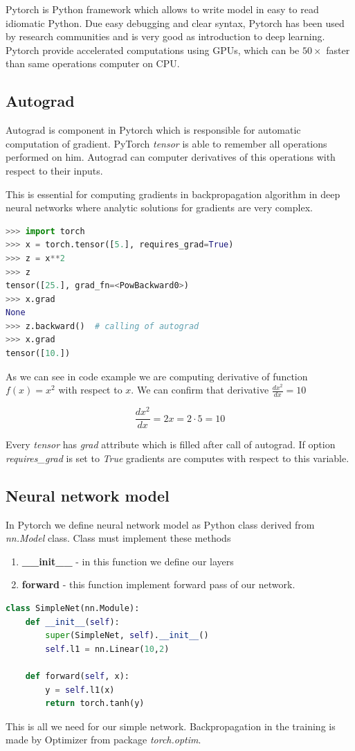Pytorch is Python framework which allows to write model in easy to read idiomatic Python. Due easy debugging and clear syntax, Pytorch has been used by research communities and is very good as introduction to deep learning. Pytorch provide accelerated computations using GPUs, which can be $50 \times$ faster than same operations computer on CPU.

\subsection{Autograd}

Autograd is component in Pytorch which is responsible for automatic computation of gradient. PyTorch \textit{tensor} is able to remember all operations performed on him. Autograd can computer derivatives of this operations with respect to their inputs. 

This is essential for computing gradients in backpropagation algorithm in deep neural networks where analytic solutions for gradients are very complex.

\begin{lstlisting}[language=Python]
>>> import torch
>>> x = torch.tensor([5.], requires_grad=True)
>>> z = x**2
>>> z
tensor([25.], grad_fn=<PowBackward0>)
>>> x.grad
None
>>> z.backward()  # calling of autograd
>>> x.grad
tensor([10.])
\end{lstlisting}

As we can see in code example we are computing derivative of function $f(x) = x^2$ with respect to $x$. We can confirm that derivative $\frac{d x^2}{d x} = 10$

$$ \frac{d x^2}{d x} = 2x = 2\cdot 5 = 10 $$

Every \textit{tensor} has \textit{grad} attribute which is filled after call of autograd. If option \textit{requires\_grad} is set to \textit{True} gradients are computes with respect to this variable.

\subsection{Neural network model}

In Pytorch we define neural network model as Python class derived from \textit{nn.Model} class. Class must implement these methods
\begin{enumerate}
    \item \textbf{\_\_init\_\_} - in this function we define our layers
    \item \textbf{forward} - this function implement forward pass of our network.
\end{enumerate}

\begin{lstlisting}[language=Python]
class SimpleNet(nn.Module):
    def __init__(self):
        super(SimpleNet, self).__init__()
        self.l1 = nn.Linear(10,2)
    
    def forward(self, x):
        y = self.l1(x)
        return torch.tanh(y)
\end{lstlisting}


This is all we need for our simple network. Backpropagation in the training is made by Optimizer from package \textit{torch.optim}.

